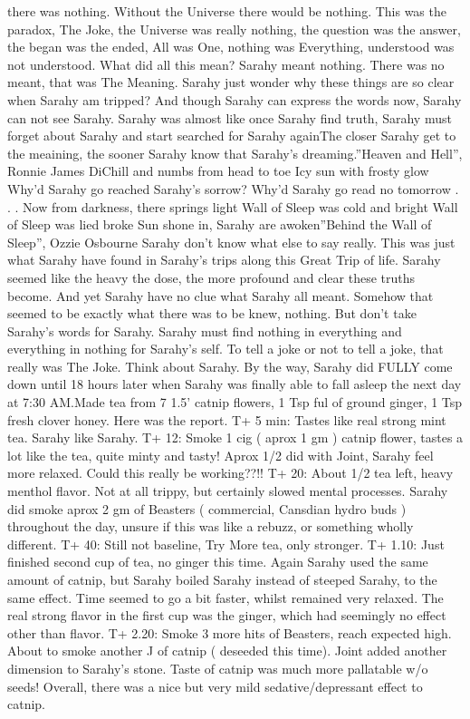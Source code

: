 \documentclass[12pt]{book}
\begin{document}
there was nothing. Without the Universe there would be nothing. This was the paradox, The Joke, the Universe was really nothing, the question was the answer, the began was the ended, All was One, nothing was Everything, understood was not understood. What did all this mean? Sarahy meant nothing. There was no meant, that was The Meaning. Sarahy just wonder why these things are so clear when Sarahy am tripped? And though Sarahy can express the words now, Sarahy can not see Sarahy. Sarahy was almost like once Sarahy find truth, Sarahy must forget about Sarahy and start searched for Sarahy againThe closer Sarahy get to the meaining, the sooner Sarahy know that Sarahy's dreaming.''Heaven and Hell'', Ronnie James DiChill and numbs from head to toe Icy sun with frosty glow Why'd Sarahy go reached Sarahy's sorrow? Why'd Sarahy go read no tomorrow  . . .  Now from darkness, there springs light Wall of Sleep was cold and bright Wall of Sleep was lied broke Sun shone in, Sarahy are awoken''Behind the Wall of Sleep'', Ozzie Osbourne Sarahy don't know what else to say really. This was just what Sarahy have found in Sarahy's trips along this Great Trip of life. Sarahy seemed like the heavy the dose, the more profound and clear these truths become. And yet Sarahy have no clue what Sarahy all meant. Somehow that seemed to be exactly what there was to be knew, nothing. But don't take Sarahy's words for Sarahy. Sarahy must find nothing in everything and everything in nothing for Sarahy's self. To tell a joke or not to tell a joke, that really was The Joke. Think about Sarahy. By the way, Sarahy did FULLY come down until 18 hours later when Sarahy was finally able to fall asleep the next day at 7:30 AM.Made tea from 7 1.5' catnip flowers, 1 Tsp ful of ground ginger, 1 Tsp fresh clover honey. Here was the report. T+ 5 min: Tastes like real strong mint tea. Sarahy like Sarahy. T+ 12: Smoke 1 cig ( aprox 1 gm ) catnip flower, tastes a lot like the tea, quite minty and tasty! Aprox 1/2 did with Joint, Sarahy feel more relaxed. Could this really be working??!! T+ 20: About 1/2 tea left, heavy menthol flavor. Not at all trippy, but certainly slowed mental processes. Sarahy did smoke aprox 2 gm of Beasters ( commercial, Cansdian hydro buds ) throughout the day, unsure if this was like a rebuzz, or something wholly different. T+ 40: Still not baseline, Try More tea, only stronger. T+ 1.10: Just finished second cup of tea, no ginger this time. Again Sarahy used the same amount of catnip, but Sarahy boiled Sarahy instead of steeped Sarahy, to the same effect. Time seemed to go a bit faster, whilst remained very relaxed. The real strong flavor in the first cup was the ginger, which had seemingly no effect other than flavor. T+ 2.20: Smoke 3 more hits of Beasters, reach expected high. About to smoke another J of catnip ( deseeded this time). Joint added another dimension to Sarahy's stone. Taste of catnip was much more pallatable w/o seeds! Overall, there was a nice but very mild sedative/depressant effect to catnip.
\end{document}
